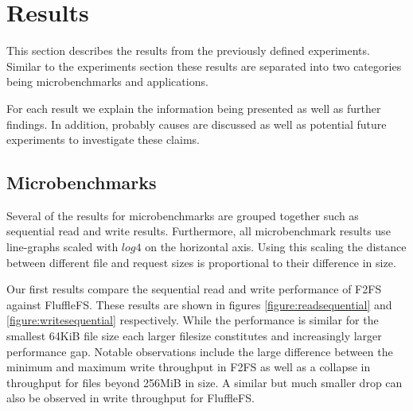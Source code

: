 \section{Results}

This section describes the results from the previously defined experiments.
Similar to the experiments section these results are separated into two
categories being microbenchmarks and applications.

For each result we explain the information being presented as well as further
findings. In addition, probably causes are discussed as well as
potential future experiments to investigate these claims.

\subsection{Microbenchmarks}

Several of the results for microbenchmarks are grouped together such as
sequential read and write results. Furthermore, all microbenchmark results use
line-graphs scaled with $log4$ on the horizontal axis. Using this scaling the
distance between different file and request sizes is proportional to their
difference in size.


\label{re3}

Our first results compare the sequential read and write performance of F2FS
against FluffleFS. These results are shown in figures
\ref{figure:readsequential} and \ref{figure:writesequential} respectively.
While the performance is similar for the smallest 64KiB file size each larger
filesize constitutes and increasingly larger performance gap. Notable
observations include the large difference between the minimum and
maximum write throughput in F2FS as well as a collapse in throughput for files
beyond 256MiB in size. A similar but much smaller drop can also be observed in
write throughput for FluffleFS.

